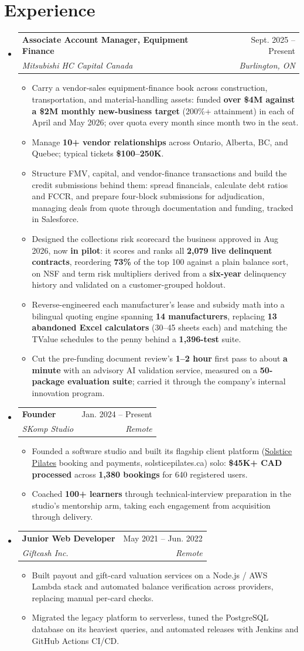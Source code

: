 \documentclass[letterpaper,11pt]{article}
\makeatletter
\newcommand{\resumeItem}[1]{
  \item\small{
    {#1\vspace{-2pt}}
  }
}
\newcommand{\resumeSubheading}[4]{
  \vspace{-2pt}\item
    \begin{tabular*}{0.97\textwidth}[t]{l@{\extracolsep{\fill}}r}
      \textbf{#1} & #2 \\
      \textit{\small#3} & \textit{\small #4} \\
    \end{tabular*}\vspace{-7pt}
}
\newcommand{\resumeSubHeadingListStart}{\begin{itemize}[leftmargin=0.15in, label={}]}
\newcommand{\resumeSubHeadingListEnd}{\end{itemize}}
\newcommand{\resumeItemListStart}{\begin{itemize}}
\newcommand{\resumeItemListEnd}{\end{itemize}\vspace{-5pt}}
\makeatother
\begin{document}
\section{Experience}
  \resumeSubHeadingListStart
    \resumeSubheading
      {Associate Account Manager, Equipment Finance}{Sept. 2025 -- Present}
      {Mitsubishi HC Capital Canada}{Burlington, ON}
      \resumeItemListStart
        \resumeItem{Carry a vendor-sales equipment-finance book across construction, transportation, and material-handling assets: funded \textbf{over \$4M against a \$2M monthly new-business target} (200\%+ attainment) in each of April and May 2026; over quota every month since month two in the seat.}
        \resumeItem{Manage \textbf{10+ vendor relationships} across Ontario, Alberta, BC, and Quebec; typical tickets \textbf{\$100--250K}.}
        \resumeItem{Structure FMV, capital, and vendor-finance transactions and build the credit submissions behind them: spread financials, calculate debt ratios and FCCR, and prepare four-block submissions for adjudication, managing deals from quote through documentation and funding, tracked in Salesforce.}
        \resumeItem{Designed the collections risk scorecard the business approved in Aug 2026, now \textbf{in pilot}: it scores and ranks all \textbf{2,079 live delinquent contracts}, reordering \textbf{73\%} of the top 100 against a plain balance sort, on NSF and term risk multipliers derived from a \textbf{six-year} delinquency history and validated on a customer-grouped holdout.}
        \resumeItem{Reverse-engineered each manufacturer's lease and subsidy math into a bilingual quoting engine spanning \textbf{14 manufacturers}, replacing \textbf{13 abandoned Excel calculators} (30--45 sheets each) and matching the TValue schedules to the penny behind a \textbf{1,396-test} suite.}
        \resumeItem{Cut the pre-funding document review's \textbf{1--2 hour} first pass to about \textbf{a minute} with an advisory AI validation service, measured on a \textbf{50-package evaluation suite}; carried it through the company's internal innovation program.}
      \resumeItemListEnd
    \resumeSubheading
      {Founder}{Jan. 2024 -- Present}
      {SKomp Studio}{Remote}
      \resumeItemListStart
        \resumeItem{Founded a software studio and built its flagship client platform (\href{https://www.solsticepilates.ca/}{\underline{Solstice Pilates}} booking and payments, solsticepilates.ca) solo: \textbf{\$45K+ CAD processed} across \textbf{1,380 bookings} for 640 registered users.}
        \resumeItem{Coached \textbf{100+ learners} through technical-interview preparation in the studio's mentorship arm, taking each engagement from acquisition through delivery.}
      \resumeItemListEnd
    \resumeSubheading
      {Junior Web Developer}{May 2021 -- Jun. 2022}
      {Giftcash Inc.}{Remote}
      \resumeItemListStart
        \resumeItem{Built payout and gift-card valuation services on a Node.js / AWS Lambda stack and automated balance verification across providers, replacing manual per-card checks.}
        \resumeItem{Migrated the legacy platform to serverless, tuned the PostgreSQL database on its heaviest queries, and automated releases with Jenkins and GitHub Actions CI/CD.}
      \resumeItemListEnd
  \resumeSubHeadingListEnd
\end{document}
